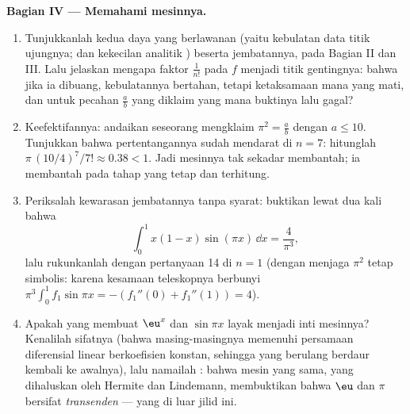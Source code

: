 \begin{problem}
\medskip
\noindent\textbf{Bagian IV --- Memahami mesinnya.}
\begin{enumerate}[resume]
  \item Tunjukkanlah kedua daya yang berlawanan (yaitu kebulatan data titik
        ujungnya; dan kekecilan analitik ) beserta
        jembatannya, pada Bagian II dan III. Lalu jelaskan mengapa faktor
        $\frac{1}{n!}$ pada $f$ menjadi titik gentingnya: bahwa jika ia dibuang,
        kebulatannya bertahan, tetapi ketaksamaan mana yang mati, dan untuk
        pecahan $\frac ab$ yang diklaim yang mana buktinya lalu
        gagal?
  \item Keefektifannya: andaikan seseorang mengklaim $\pi^2 = \frac ab$
        dengan $a \leq 10$. Tunjukkan bahwa pertentangannya sudah
        mendarat di $n = 7$: hitunglah $\pi\,(10/4)^7/7! \approx
        0.38 < 1$. Jadi mesinnya tak sekadar membantah; ia
        membantah pada tahap yang tetap dan terhitung.
  \item Periksalah kewarasan jembatannya tanpa syarat: buktikan lewat dua kali
         bahwa
        \[
        \int_0^1 x(1 - x)\sin(\pi x)\,\dd x = \frac{4}{\pi^3},
        \]
        lalu rukunkanlah dengan pertanyaan 14 di $n = 1$ (dengan menjaga
        $\pi^2$ tetap simbolis: karena kesamaan teleskopnya berbunyi $\pi^3
        \int_0^1 f_1 \sin \pi x = -(f_1''(0) + f_1''(1)) = 4$).
  \item Apakah yang membuat $\eu^x$ dan $\sin \pi x$ layak menjadi
        inti mesinnya? Kenalilah sifatnya (bahwa masing-masingnya memenuhi
        persamaan diferensial linear berkoefisien
        konstan, sehingga  yang berulang berdaur
        kembali ke awalnya), lalu namailah : bahwa mesin yang
        sama, yang dihaluskan oleh Hermite dan Lindemann, membuktikan bahwa $\eu$
        dan $\pi$ bersifat \emph{transenden} --- yang di luar jilid ini.
\end{enumerate}


\end{problem}
